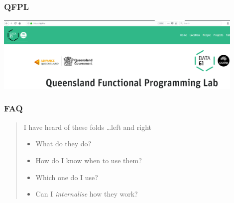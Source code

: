 \begin{frame}
\frametitle{QFPL}
\begin{center}
\includegraphics[width=0.9\textwidth]{image/qfpl_io.png}
\end{center}
\end{frame}

\begin{frame}
\frametitle{FAQ}
\begin{quote}
I have heard of these folds \ldots left and right
\begin{itemize}
\item What do they do?
\item How do I know when to use them?
\item Which one do I use?
\item Can I \emph{internalise} how they work?
\end{itemize}
\end{quote}
\end{frame}
